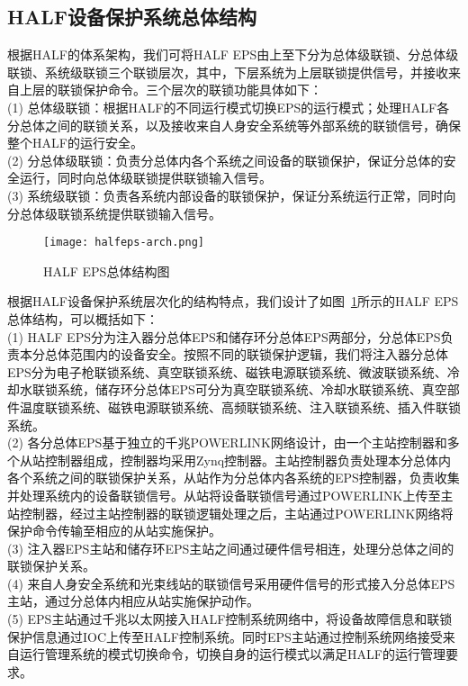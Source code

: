\subsection{HALF设备保护系统总体结构}

根据HALF的体系架构，我们可将HALF EPS由上至下分为总体级联锁、分总体级联锁、系统级联锁三个联锁层次，其中，下层系统为上层联锁提供信号，并接收来自上层的联锁保护命令。三个层次的联锁功能具体如下：\\
(1) 总体级联锁：根据HALF的不同运行模式切换EPS的运行模式；处理HALF各分总体之间的联锁关系，以及接收来自人身安全系统等外部系统的联锁信号，确保整个HALF的运行安全。\\
(2) 分总体级联锁：负责分总体内各个系统之间设备的联锁保护，保证分总体的安全运行，同时向总体级联锁提供联锁输入信号。\\
(3) 系统级联锁：负责各系统内部设备的联锁保护，保证分系统运行正常，同时向分总体级联锁系统提供联锁输入信号。

\begin{figure}[!htb]
	\centering
	\texttt{[image: halfeps-arch.png]}
	\caption{HALF EPS总体结构图}
	\label{fig:halfeps-arch}
\end{figure}

根据HALF设备保护系统层次化的结构特点，我们设计了如图~\ref{fig:halfeps-arch}所示的HALF EPS总体结构，可以概括如下：\\
(1) HALF EPS分为注入器分总体EPS和储存环分总体EPS两部分，分总体EPS负责本分总体范围内的设备安全。按照不同的联锁保护逻辑，我们将注入器分总体EPS分为电子枪联锁系统、真空联锁系统、磁铁电源联锁系统、微波联锁系统、冷却水联锁系统，储存环分总体EPS可分为真空联锁系统、冷却水联锁系统、真空部件温度联锁系统、磁铁电源联锁系统、高频联锁系统、注入联锁系统、插入件联锁系统。\\
(2) 各分总体EPS基于独立的千兆POWERLINK网络设计，由一个主站控制器和多个从站控制器组成，控制器均采用Zynq控制器。主站控制器负责处理本分总体内各个系统之间的联锁保护关系，从站作为分总体内各系统的EPS控制器，负责收集并处理系统内的设备联锁信号。从站将设备联锁信号通过POWERLINK上传至主站控制器，经过主站控制器的联锁逻辑处理之后，主站通过POWERLINK网络将保护命令传输至相应的从站实施保护。\\
(3) 注入器EPS主站和储存环EPS主站之间通过硬件信号相连，处理分总体之间的联锁保护关系。\\
(4) 来自人身安全系统和光束线站的联锁信号采用硬件信号的形式接入分总体EPS主站，通过分总体内相应从站实施保护动作。\\
(5) EPS主站通过千兆以太网接入HALF控制系统网络中，将设备故障信息和联锁保护信息通过IOC上传至HALF控制系统。同时EPS主站通过控制系统网络接受来自运行管理系统的模式切换命令，切换自身的运行模式以满足HALF的运行管理要求。

